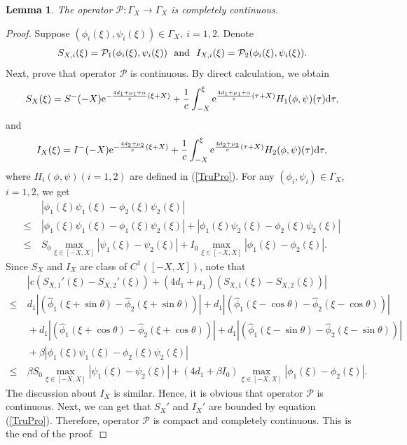 \documentclass[final,3p,times]{elsarticle}
\newtheorem{lemma}{Lemma}[section]
\numberwithin{equation}{section}
\def\d {{\rm d}}
\begin{document}
\begin{lemma}

The operator $\mathcal{P}:\Gamma_X\rightarrow\Gamma_X$ is completely continuous.
\end{lemma}
\begin{proof}
Suppose $(\phi_i(\xi),\psi_i(\xi))\in\Gamma_X,\ i=1,2.$ Denote
\begin{align*}
S_{X,i}(\xi)=\mathcal{P}_1(\phi_i(\xi),\psi_i(\xi))\ \ {\rm and}\ \ I_{X,i}(\xi)=\mathcal{P}_2(\phi_i(\xi),\psi_i(\xi)).
\end{align*}
Next, prove that operator $\mathcal{P}$  is continuous. By direct calculation, we obtain
\[
S_X(\xi) = S^-(-X) \mathrm{e}^{-\frac{4d_1+\mu_1+\alpha}{c}(\xi+X)} + \frac{1}{c}\int_{-X}^\xi \mathrm{e} ^{\frac{4d_1+\mu_1+\alpha}{c}(\tau+X)}H_1(\phi,\psi)(\tau)\d \tau,
\]
and
\[
I_X(\xi) = I^-(-X) \mathrm{e}^{-\frac{4d_2+\mu_2}{c}(\xi+X)} + \frac{1}{c}\int_{-X}^\xi \mathrm{e}^{\frac{4d_2+\mu_2}{c}(\tau+X)}H_2(\phi,\psi)(\tau)\d \tau,
\]
where $H_i(\phi,\psi)(i=1,2)$ are defined in (\ref{TruPro}).
For any $(\phi_i, \psi_i)\in\Gamma_X$, $i=1,2$, we get
\begin{align*}
&\ |\phi_1(\xi)\psi_1(\xi) - \phi_2(\xi)\psi_2(\xi)|\\
\leq & \ |\phi_1(\xi)\psi_1(\xi) - \phi_1(\xi)\psi_2(\xi)|+|\phi_1(\xi)\psi_2(\xi) - \phi_2(\xi)\psi_2(\xi)|\\
\leq & \ S_0  \max_{\xi\in[-X,X]}|\psi_1(\xi)-\psi_2(\xi)| + I_{0}\max_{\xi\in[-X,X]}|\phi_1(\xi)-\phi_2(\xi)|.
\end{align*}
Since $S_X$ and $I_X$ are class of $C^1([-X,X])$, note that
\begin{align*}
&\ \left|c(S_{X,1}'(\xi)-S_{X,2}'(\xi))+(4d_1+\mu_1)(S_{X,1}(\xi)-S_{X,2}(\xi))\right|\\
\leq
&\ d_1|(\hat{\phi}_1(\xi+\sin\theta)-\hat{\phi}_2(\xi+\sin\theta))| + d_1|(\hat{\phi}_1(\xi-\cos\theta)-\hat{\phi}_2(\xi-\cos\theta))|\\
&\ +d_1|(\hat{\phi}_1(\xi+\cos\theta)-\hat{\phi}_2(\xi+\cos\theta))| +d_1|(\hat{\phi}_1(\xi-\sin\theta)-\hat{\phi}_2(\xi-\sin\theta))|\\
&\ + \beta|\phi_1(\xi)\psi_1(\xi) - \phi_2(\xi)\psi_2(\xi)|\\
\leq &\ \beta S_0  \max_{\xi\in[-X,X]}|\psi_1(\xi)-\psi_2(\xi)| + \left(4d_1+\beta I_{0 }\right)\max_{\xi\in[-X,X]}|\phi_1(\xi)-\phi_2(\xi)|.
\end{align*}
The discussion about  $I_X$ is similar. Hence, it is obvious that operator $\mathcal{P}$  is continuous. Next, we can get that $S_X'$ and $I_X'$  are bounded by equation (\ref{TruPro}).
Therefore,  operator $\mathcal{P}$ is compact and completely continuous. This is the end of the proof.
\end{proof}
\end{document}

